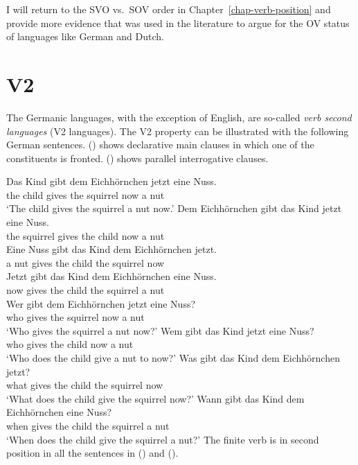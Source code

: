 I will return to the SVO vs.\ SOV order in Chapter~\ref{chap-verb-position} and provide more
evidence that was used in the literature to argue for the OV status of languages like German and Dutch.


\section{V2}
\label{sec-phenomenon-v2}

The Germanic languages, with the exception of English, are so-called \emph{verb second languages} (V2
languages). The V2
property can be illustrated with the following German sentences. () shows declarative main
clauses in which one of the constituents is fronted. () shows parallel interrogative clauses.

\eal
\ex 
\gll Das Kind  gibt dem Eichhörnchen jetzt eine Nuss.\\
     the child gives the squirrel now a nut\\
\glt `The child gives the squirrel a nut now.'
\ex 
\gll Dem Eichhörnchen gibt das Kind jetzt eine Nuss.\\
     the squirrel gives the child now a nut\\
\ex 
\gll Eine Nuss gibt das Kind dem Eichhörnchen jetzt.\\
     a nut gives the child the squirrel now\\
\ex 
\gll Jetzt gibt das Kind dem Eichhörnchen eine Nuss.\\
     now gives the child the squirrel a nut\\
\zl
\eal
\ex 
\gll Wer gibt dem Eichhörnchen jetzt eine Nuss?\\  
     who gives the squirrel now a nut\\
\glt `Who gives the squirrel a nut now?'
\ex 
\gll Wem gibt das Kind jetzt eine Nuss?\\
     who gives the child now a nut\\
\glt `Who does the child give a nut to now?'
\ex 
\gll Was gibt das Kind dem Eichhörnchen jetzt?\\
     what gives the child the squirrel now\\
\glt `What does the child give the squirrel now?'
\ex 
\gll Wann gibt das Kind dem Eichhörnchen eine Nuss?\\
     when gives the child the squirrel a nut\\
\glt `When does the child give the squirrel a nut?'
\zl
The finite verb is in second position in all the sentences in () and ().


